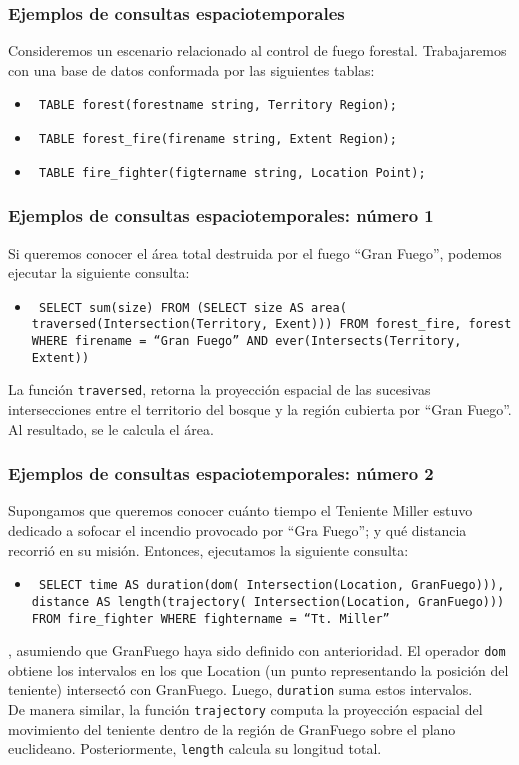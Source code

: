 \begin{frame}
	\frametitle{Ejemplos de consultas espaciotemporales}
	Consideremos un escenario relacionado al control de fuego forestal. Trabajaremos con una base de datos conformada por las siguientes tablas: 
	\begin{itemize}
	\item \texttt{
		TABLE forest(forestname string, Territory Region);
	}

	\item \texttt{
		TABLE forest\_fire(firename string, Extent Region);
	}

	\item \texttt{
		TABLE fire\_fighter(figtername string, Location Point);
	}
	\end{itemize}

\end{frame}

\begin{frame}
	\frametitle{Ejemplos de consultas espaciotemporales: número 1}
	Si queremos conocer el área total destruida por el fuego ``Gran Fuego'', podemos ejecutar la siguiente consulta: \pause 
	\begin{itemize}
	\item \texttt{
		SELECT sum(size) FROM 
			(SELECT size AS area( 
			traversed(Intersection(Territory, Exent))) 
			FROM forest\_fire, forest 
			WHERE firename = ``Gran Fuego'' AND 
			ever(Intersects(Territory, Extent))
	}
	\end{itemize}
	La función \texttt{traversed}, retorna la proyección espacial de las sucesivas intersecciones entre el territorio del bosque y la región cubierta por ``Gran Fuego''. Al resultado, se le calcula el área.
\end{frame}

\begin{frame}
	\frametitle{Ejemplos de consultas espaciotemporales: número 2}
	Supongamos que queremos conocer cuánto tiempo el Teniente Miller estuvo dedicado a sofocar el incendio provocado por ``Gra Fuego''; y qué distancia recorrió en su misión. Entonces, ejecutamos la siguiente consulta: \pause 
	\begin{itemize}
	\item \texttt{
		SELECT time AS duration(dom( 
					Intersection(Location, GranFuego))), 
				distance AS length(trajectory( 
					Intersection(Location, GranFuego))) 
			FROM fire\_fighter 
			WHERE fightername = ``Tt. Miller''
	}
	\end{itemize}
	, asumiendo que GranFuego haya sido definido con anterioridad.
	El operador \texttt{dom} obtiene los intervalos en los que Location (un punto representando la posición del teniente) intersectó con GranFuego. Luego, \texttt{duration} suma estos intervalos. \\
	De manera similar, la función \texttt{trajectory} computa la proyección espacial del movimiento del teniente dentro de la región de GranFuego sobre el plano euclideano. Posteriormente, \texttt{length} calcula su longitud total.
\end{frame}
